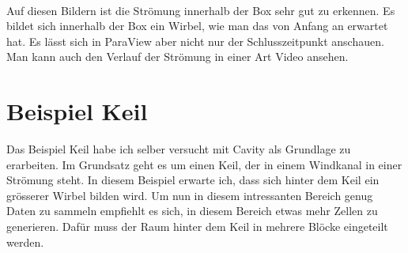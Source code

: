 \begin{refsection}
\begin{minipage}{0.5 \linewidth}
\end{minipage} \\
Auf diesen Bildern ist die Strömung innerhalb der Box sehr gut zu erkennen. Es bildet sich innerhalb der Box ein Wirbel, wie man das von Anfang an erwartet hat. Es lässt sich in ParaView aber nicht nur der Schlusszeitpunkt anschauen. Man kann auch den Verlauf der Strömung in einer Art Video ansehen.
\section{Beispiel Keil}
Das Beispiel Keil habe ich selber versucht mit Cavity als Grundlage zu erarbeiten. Im Grundsatz geht es um einen Keil, der in einem Windkanal in einer Strömung steht. In diesem Beispiel erwarte ich, dass sich hinter dem Keil ein grösserer Wirbel bilden wird. Um nun in diesem intressanten Bereich genug Daten zu sammeln empfiehlt es sich, in diesem Bereich etwas mehr Zellen zu generieren. Dafür muss der Raum hinter dem Keil in mehrere Blöcke eingeteilt werden.

\end{refsection}

